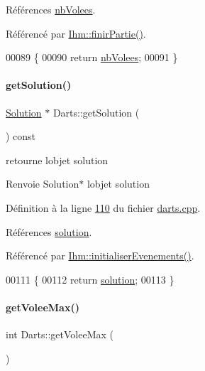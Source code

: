 Références \hyperlink{darts_8h_source_l00080}{nb\+Volees}.



Référencé par \hyperlink{ihm_8cpp_source_l00365}{Ihm\+::finir\+Partie()}.


\begin{DoxyCode}
00089 \{
00090     \textcolor{keywordflow}{return} \hyperlink{class_darts_ae73a0b876ca354c7abd0d39db15c94fa}{nbVolees};
00091 \}
\end{DoxyCode}
\mbox{\label{class_darts_a2e41c247a12dfd3065c77c2484fc5532}} 
\paragraph{\texorpdfstring{get\+Solution()}{getSolution()}}
{\footnotesize\ttfamily \hyperlink{class_solution}{Solution} $\ast$ Darts\+::get\+Solution (\begin{DoxyParamCaption}{ }\end{DoxyParamCaption}) const}



retourne l\textquotesingle{}objet solution 

\begin{DoxyReturn}{Renvoie}
Solution$\ast$ l\textquotesingle{}objet solution 
\end{DoxyReturn}


Définition à la ligne \hyperlink{darts_8cpp_source_l00110}{110} du fichier \hyperlink{darts_8cpp_source}{darts.\+cpp}.



Références \hyperlink{darts_8h_source_l00072}{solution}.



Référencé par \hyperlink{ihm_8cpp_source_l00075}{Ihm\+::initialiser\+Evenements()}.


\begin{DoxyCode}
00111 \{
00112     \textcolor{keywordflow}{return} \hyperlink{class_darts_a40733010dc6ae4ce93140804b4d191ea}{solution};
00113 \}
\end{DoxyCode}
\mbox{\label{class_darts_af2ca14bafbcdabe87fc306cc2e1d390e}} 
\paragraph{\texorpdfstring{get\+Volee\+Max()}{getVoleeMax()}}
{\footnotesize\ttfamily int Darts\+::get\+Volee\+Max (\begin{DoxyParamCaption}{ }\end{DoxyParamCaption})}



